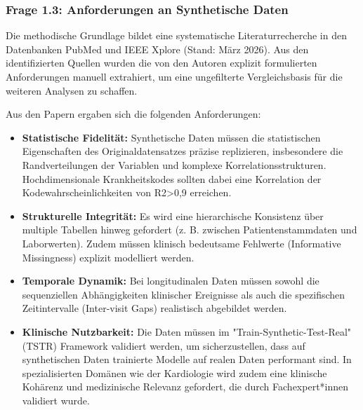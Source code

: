 \subsubsection{Frage 1.3: Anforderungen an Synthetische Daten}
\begin{description}[style=nextline, font=\bfseries]

    \item[Methodik] 
    Die methodische Grundlage bildet eine systematische Literaturrecherche in den Datenbanken PubMed und IEEE Xplore (Stand: März 2026). Aus den identifizierten Quellen wurden die von den Autoren explizit formulierten Anforderungen manuell extrahiert, um eine ungefilterte Vergleichsbasis für die weiteren Analysen zu schaffen.

    \item[Ergebnisse] 
    Aus den Papern ergaben sich die folgenden Anforderungen:
    \begin{itemize}[leftmargin=1.5em, labelsep=0.5em, itemsep=4pt, topsep=4pt]
    \item \textbf{Statistische Fidelität:} Synthetische Daten müssen die statistischen Eigenschaften des Originaldatensatzes präzise replizieren, insbesondere die Randverteilungen der Variablen und komplexe Korrelationsstrukturen. Hochdimensionale Krankheitskodes sollten dabei eine Korrelation der Kodewahrscheinlichkeiten von R2>0,9 erreichen. \citep{chen_generating_2025} \citep{theodorou_synthesize_2023}
    
    \item \textbf{Strukturelle Integrität:} Es wird eine hierarchische Konsistenz über multiple Tabellen hinweg gefordert (z. B. zwischen Patientenstammdaten und Laborwerten). Zudem müssen klinisch bedeutsame Fehlwerte (Informative Missingness) explizit modelliert werden.\citep{josling_novel_2026}
    
    \item \textbf{Temporale Dynamik:} Bei longitudinalen Daten müssen sowohl die sequenziellen Abhängigkeiten klinischer Ereignisse als auch die spezifischen Zeitintervalle (Inter-visit Gaps) realistisch abgebildet werden. \citep{josling_novel_2026} \citep{theodorou_synthesize_2023}
    
    \item \textbf{Klinische Nutzbarkeit:} Die Daten müssen im "Train-Synthetic-Test-Real" (TSTR) Framework validiert werden, um sicherzustellen, dass auf synthetischen Daten trainierte Modelle auf realen Daten performant sind. In spezialisierten Domänen wie der Kardiologie wird zudem eine klinische Kohärenz und medizinische Relevanz gefordert, die durch Fachexpert*innen validiert wurde. \citep{theodorou_synthesize_2023} \citep{jung_clinical_2025}
    

\end{itemize}
\end{description}
